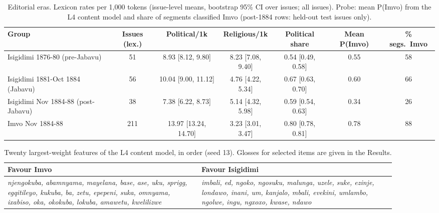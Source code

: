 \begin{table}[h]\centering\small\caption{Editorial eras. Lexicon rates per 1{,}000 tokens (issue-level means, bootstrap 95\% CI over issues; all issues). Probe: mean P(Imvo) from the L4 content model and share of segments classified Imvo (post-1884 rows: held-out test issues only).}
\begin{tabular}{@{}lcccccc@{}}\toprule Group & Issues (lex.) & Political/1k & Religious/1k & Political share & Mean P(Imvo) & \% segs.\ Imvo \\ \midrule
Isigidimi 1876-80 (pre-Jabavu) & 51 & 8.93 [8.12, 9.80] & 8.23 [7.08, 9.40] & 0.54 [0.49, 0.58] & 0.55 & 58 \\
Isigidimi 1881-Oct 1884 (Jabavu) & 56 & 10.04 [9.00, 11.12] & 4.76 [4.22, 5.34] & 0.67 [0.63, 0.70] & 0.60 & 66 \\
Isigidimi Nov 1884-88 (post-Jabavu) & 38 & 7.38 [6.22, 8.73] & 5.14 [4.32, 5.98] & 0.59 [0.54, 0.63] & 0.34 & 26 \\
Imvo Nov 1884-88 & 211 & 13.97 [13.24, 14.70] & 3.23 [3.01, 3.47] & 0.80 [0.78, 0.81] & 0.78 & 88 \\
\bottomrule\end{tabular}\label{tab:s4}\end{table}
\begin{table}[h]\centering\small\caption{Twenty largest-weight features of the L4 content model, in order (seed 13). Glosses for selected items are given in the Results.}
\begin{tabular}{@{}p{0.45\linewidth}p{0.45\linewidth}@{}}\toprule Favour Imvo & Favour Isigidimi \\ \midrule
\emph{njengokuba, abamnyama, mayelana, base, ase, uku, sprigg, egqitileyo, kukuba, ba, zetu, epepeni, suka, omnyama, ixabiso, oka, okokuba, lokuba, amawetu, kwelilizwe} & \emph{imbali, ed, ngoko, ngosuku, malunga, uzele, suke, ezinje, londawo, inani, um, kanjalo, mbali, evekini, umlambo, ngolwe, ingu, ngxoxo, kwase, ndawo} \\
\bottomrule\end{tabular}\label{tab:s5}\end{table}
